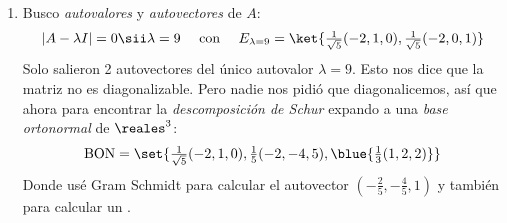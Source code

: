 \begin{enumerate}[label=(\alph*)]
  \item Busco \textit{autovalores} y \textit{autovectores} de $A$:
        $$
          |A - \lambda I| = 0
          \sii
          \lambda = 9
          \quad \text{ con } \quad
          E_{\lambda = 9} = \ket{\textstyle\frac{1}{\sqrt{5}}(-2,1,0), \frac{1}{\sqrt{5}}(-2, 0, 1)}
        $$
        Solo salieron 2 autovectores del único autovalor $\lambda = 9$. Esto nos dice que la matriz no es diagonalizable. Pero
        nadie nos pidió que diagonalicemos, así que ahora para encontrar la \textit{descomposición de Schur}
        expando a una \textit{base ortonormal} de $\reales^3$:
        $$
          \text{BON} =
          \set{
            \textstyle \frac{1}{\sqrt{5}}(-2,1,0), \frac{1}{5}(-2, -4, 5), \blue{\frac{1}{3}(1, 2, 2)}
          }
        $$
        Donde usé Gram Schmidt para calcular el autovector $(-\frac{2}{5}, -\frac{4}{5}, 1)$ y también para calcular
        un .


\end{enumerate}
